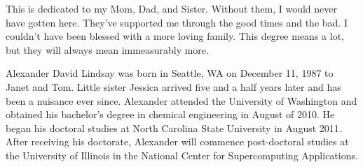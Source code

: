 \makecopyrightpage

\maketitlepage

\begin{dedication}
This is dedicated to my Mom, Dad, and Sister. Without them, I would never have gotten here. They've supported me through the good times and the bad. I couldn't have been blessed with a more loving family. This degree means a lot, but they will always mean immeasurably more.
\end{dedication}

\begin{biography}
Alexander David Lindsay was born in Seattle, WA on December 11, 1987 to Janet and Tom. Little sister Jessica arrived five and a half years later and has been a nuisance ever since. Alexander attended the University of Washington and obtained his bachelor's degree in chemical engineering in August of 2010. He began his doctoral studies at North Carolina State University in August 2011. After receiving his doctorate, Alexander will commence post-doctoral studies at the University of Illinois in the National Center for Supercomputing Applications.
\end{biography}

